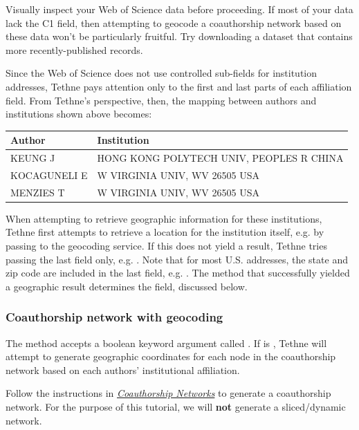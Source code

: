 \documentclass[letterpaper,10pt,english]{sphinxmanual}
\begin{document}
Visually inspect your Web of Science data before proceeding. If most of your data lack the
C1 field, then attempting to geocode a coauthorship network based on these data won't
be particularly fruitful. Try downloading a dataset that contains more recently-published
records.

Since the Web of Science does not use controlled sub-fields for institution addresses,
Tethne pays attention only to the first and last parts of each affiliation field. From
Tethne's perspective, then, the mapping between authors and institutions shown above
becomes:

\begin{tabulary}{\linewidth}{|L|L|}
\hline
\textsf{\relax 
Author
} & \textsf{\relax 
Institution
}\\
\hline
KEUNG J
 & 
HONG KONG POLYTECH UNIV, PEOPLES R CHINA
\\

KOCAGUNELI E
 & 
W VIRGINIA UNIV, WV 26505 USA
\\

MENZIES T
 & 
W VIRGINIA UNIV, WV 26505 USA
\\
\hline\end{tabulary}


When attempting to retrieve geographic information for these institutions, Tethne first
attempts to retrieve a location for the institution itself, e.g. by passing  to the geocoding service. If this does not yield a
result, Tethne tries passing the last field only, e.g. . Note that for
most U.S. addresses, the state and zip code are included in the last field, e.g. . The method that successfully yielded a geographic result determines the
 field, discussed below.


\subsubsection{Coauthorship network with geocoding}
\label{tutorial.geonetworks:coauthorship-network-with-geocoding}
The {\hyperref[tethne.networks.authors:tethne.networks.authors.coauthors]{}} method accepts a boolean keyword argument called
. If  is , Tethne will attempt to generate geographic
coordinates for each node in the coauthorship network based on each authors'
institutional affiliation.

Follow the instructions in {\hyperref[tutorial.coauthors:coauthorship]{\emph{Coauthorship Networks}}} to generate a coauthorship network. For the
purpose of this tutorial, we will \textbf{not} generate a sliced/dynamic network.
\end{document}
